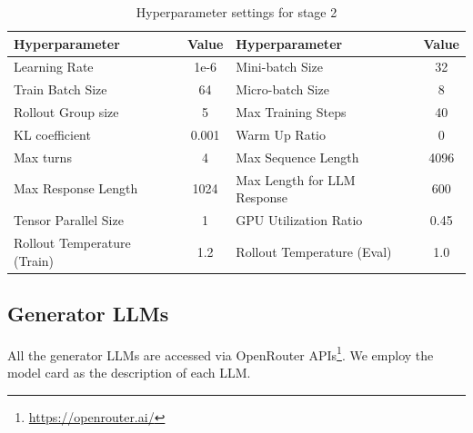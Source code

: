 \begin{table}[!h]
\centering
\large
\renewcommand{\arraystretch}{1.2}
\setlength{\tabcolsep}{12pt}

\begin{tabular}{p{5.5cm} c p{5.5cm} c}
\toprule
\textbf{Hyperparameter} & \textbf{Value} & \textbf{Hyperparameter} & \textbf{Value} \\
\midrule
Learning Rate & 1e-6 & Mini-batch Size & 32  \\
Train Batch Size & 64 & Micro-batch Size & 8 \\
Rollout Group size & 5 & Max Training Steps & 40 \\
KL coefficient & 0.001 & Warm Up Ratio & 0 \\
Max turns & 4 & Max Sequence Length & 4096 \\
Max Response Length & 1024 & Max Length for LLM Response & 600 \\
Tensor Parallel Size & 1 & GPU Utilization Ratio & 0.45 \\
Rollout Temperature (Train) & 1.2 & Rollout Temperature (Eval) & 1.0 \\
\bottomrule
\end{tabular}
\caption{Hyperparameter settings for stage 2}
\label{tab:hyper_stage2}
\end{table}
\subsection{Generator LLMs}
All the generator LLMs are accessed via OpenRouter APIs\footnote{\url{https://openrouter.ai/}}. We employ the model card as the description of each LLM.
